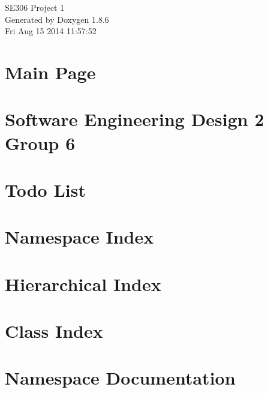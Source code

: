 \documentclass[twoside]{book}
\newcommand{\clearemptydoublepage}{%
  \newpage{\pagestyle{empty}\cleardoublepage}%
}
\begin{document}
\hypersetup{pageanchor=false}
\begin{titlepage}
\vspace*{7cm}
\begin{center}%
{\Large S\-E306 Project 1 }\\
\vspace*{1cm}
{\large Generated by Doxygen 1.8.6}\\
\vspace*{0.5cm}
{\small Fri Aug 15 2014 11:57:52}\\
\end{center}
\end{titlepage}
\clearemptydoublepage
\tableofcontents
\clearemptydoublepage
{}
\hypersetup{pageanchor=true}

\chapter{Main Page}
\label{index}\hypertarget{index}{}
\chapter{Software Engineering Design 2 Group 6}
\label{md_README}
\hypertarget{md_README}{}

\chapter{Todo List}
\label{todo}
\hypertarget{todo}{}

\chapter{Namespace Index}

\chapter{Hierarchical Index}

\chapter{Class Index}

\chapter{Namespace Documentation}



\end{document}
